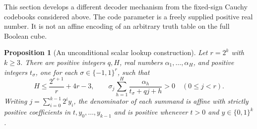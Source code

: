 \documentclass[11pt]{article}
\newtheorem{proposition}{Proposition}
\begin{document}
This section develops a different decoder mechanism from the fixed-sign
Cauchy codebooks considered above. The code parameter is a freely supplied
positive real number. It is not an affine encoding of an arbitrary truth
table on the full Boolean cube.

\begin{proposition}[An unconditional scalar lookup construction]
Let $r=2^k$ with $k\geq3$. There are positive integers $q,H$, real
numbers $\alpha_1,\ldots,\alpha_H$, and positive integers
$t_\sigma$, one for each $\sigma\in\{-1,1\}^r$, such that
\[
 H\leq\frac{2^{r+1}}r+4r-3,
 \qquad
 \sigma_j\sum_{h=1}^H\frac{\alpha_h}{t_\sigma+qj+h}>0
 \quad(0\leq j<r).
\]
Writing $j=\sum_{i=0}^{k-1}2^iy_i$, the denominator of each summand
is affine with strictly positive coefficients in $t,y_0,\ldots,y_{k-1}$
and is positive whenever $t>0$ and $y\in\{0,1\}^k$.
\end{proposition}
\end{document}
